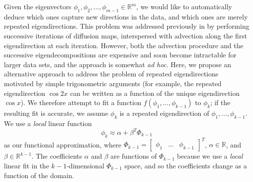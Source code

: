 \documentclass[3p]{elsarticle}
\begin{document}
Given the eigenvectors $\phi_1, \phi_2, \dots, \phi_{m-1} \in \mathbb{R}^m$, we would like to automatically deduce
which ones capture new directions in the data, and which ones are merely repeated eigendirections.
%
This problem was addressed previously in \cite{gerber2007robust} by performing
successive iterations of diffusion maps, interspersed with advection along the first eigendirection at each iteration.
%
However, both the advection
procedure and the successive eigendecompositions are expensive and soon become intractable for larger data sets, 
and the approach is somewhat {\em ad hoc}.
%
Here, we propose an alternative approach to address the problem of repeated eigendirections
motivated by simple trigonometric arguments (for example, the repeated eigendirection $\cos2x$ 
can be written as a function of the unique eigendirection $\cos x$).
%
We therefore attempt to fit a function $f(\phi_1, \dots, \phi_{k-1})$ to $\phi_{k}$; if the
resulting fit is accurate, we assume $\phi_{k}$ is a repeated eigendirection of $\phi_1, \dots, \phi_{k-1}$.
%
We use a {\em local} linear function
\begin{equation}
\phi_k \approx \alpha + \beta^T \Phi_{k-1}
\end{equation}
%
as our functional approximation, where
%
$\Phi_{k-1} = \begin{bmatrix} \phi_1 & \dots & \phi_{k-1} \end{bmatrix}^T$,
$\alpha \in \mathbb{R}$, and $\beta \in \mathbb{R}^{k-1}$.
%
The coefficients $\alpha$ and $\beta$ are functions of $\Phi_{k-1}$ because we use a {\em local} linear fit in the $k-1$-dimensional $\Phi_{k-1}$ space, and so the coefficients change as a function of the domain.
\end{document}
